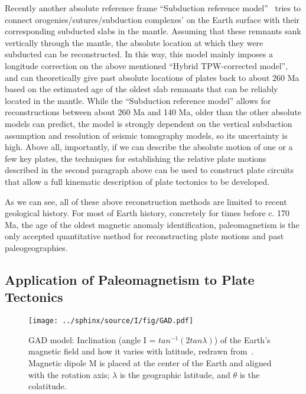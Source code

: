 Recently another absolute reference frame ``Subduction reference
model''~\cite{v10} tries to connect orogenies/sutures/subduction complexes' on
the Earth surface with their corresponding subducted slabs in the mantle.
Assuming that these remnants sank vertically through the mantle, the absolute
location at which they were subducted can be reconstructed. In this way, this
model mainly imposes a longitude correction on the above mentioned ``Hybrid
TPW-corrected model'', and can theoretically give past absolute locations of
plates back to about 260 Ma based on the estimated age of the oldest slab
remnants that can be reliably located in the mantle. While the ``Subduction
reference model'' allows for reconstructions between about 260 Ma and 140 Ma,
older than the other absolute models can predict, the model is strongly
dependent on the vertical subduction assumption and resolution of seismic
tomography models, so its uncertainty is high. Above all, importantly, if we can
describe the absolute motion of one or a few key plates, the techniques for
establishing the relative plate motions described in the second paragraph above
can be used to construct plate circuits that allow a full kinematic description
of plate tectonics to be developed.

As we can see, all of these above reconstruction methods are limited to recent
geological history. For most of Earth history, concretely for times before c.
170 Ma, the age of the oldest magnetic anomaly identification, paleomagnetism
is the only accepted quantitative method for reconstructing plate motions and
past paleogeographies.

\subsection{Application of Paleomagnetism to Plate Tectonics}

\begin{figure}
    \centering
        \texttt{[image: ../sphinx/source/I/fig/GAD.pdf]}
    \captionsetup{width=.95\textwidth}
	\caption{GAD model: Inclination (angle I = $tan^{-1}(2tan\lambda)$) of the
	Earth's magnetic field and how it varies with latitude, redrawn
	from~\cite{B98,T19,T08}. Magnetic dipole M is placed at the center of the
	Earth and aligned with the rotation axis; $\lambda$ is the geographic
	latitude, and $\theta$ is the colatitude.}\label{Fig:chap_intro_gad}
\end{figure}

